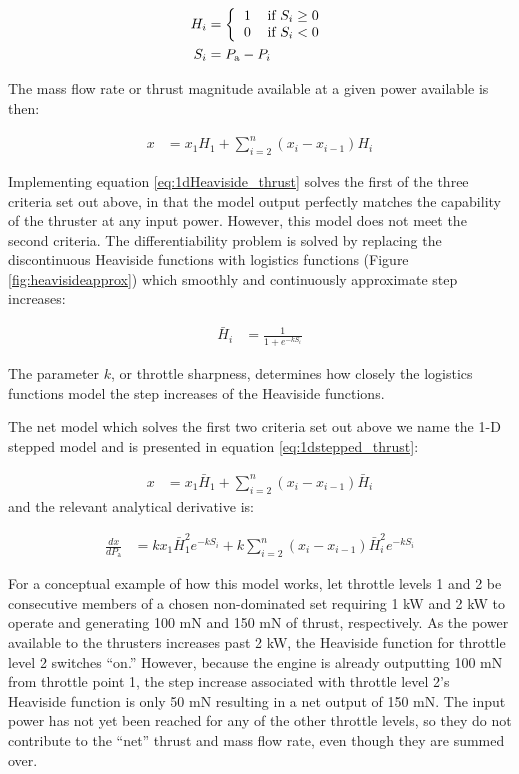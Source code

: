 \begin{align}
H_{i} &= \left \{
\begin{tabular}{cc}
1 & if $S_i \geq 0$\\
0 & if $S_i < 0$
\end{tabular}
\right.
\label{eq:Heaviside}\\
S_i &= P_\textrm{a} - P_i
\label{eq:Si}
\end{align}

The mass flow rate or thrust magnitude available at a given power available is then:

\begin{align}
x &= x_1H_1+\sum\limits_{i=2}^{n}(x_i-x_{i-1})H_{i}
\label{eq:1dHeaviside_thrust}
\end{align}

Implementing equation \ref{eq:1dHeaviside_thrust} solves the first of the three criteria set out above, in that the model output perfectly matches the capability of the thruster at any input power. However, this model does not meet the second criteria. The differentiability problem is solved by replacing the discontinuous Heaviside functions with logistics functions (Figure \ref{fig:heavisideapprox}) which smoothly and continuously approximate step increases:

\begin{align}
\bar{H}_{i} &= \frac{1}{1 + e^{-kS_i}}
\label{eq:logistic}
\end{align}

The parameter $k$, or throttle sharpness, determines how closely the logistics functions model the step increases of the Heaviside functions. 

The net model which solves the first two criteria set out above we name the 1-D stepped model and is presented in equation \ref{eq:1dstepped_thrust}:

\begin{align} 
x &= x_1\bar{H}_1+\sum\limits_{i=2}^{n}(x_i-x_{i-1})\bar{H}_i
\label{eq:1dstepped_thrust}
\end{align}
and the relevant analytical derivative is:

\begin{align}
\frac{dx}{dP_\textrm{a}} &= kx_1\bar{H}_1^2e^{-kS_i}+k\sum\limits_{i=2}^{n}(x_i-x_{i-1})\bar{H}_i^2e^{-kS_i}
\label{eq:1dstepped_thrust_dp}
\end{align}

For a conceptual example of how this model works, let throttle levels 1 and 2 be consecutive members of a chosen non-dominated set requiring 1 kW and 2 kW to operate and generating 100 mN and 150 mN of thrust, respectively. As the power available to the thrusters increases past 2 kW, the Heaviside function for throttle level 2 switches ``on.'' However, because the engine is already outputting 100 mN from throttle point 1, the step increase associated with throttle level 2's Heaviside function is only 50 mN resulting in a net output of 150 mN. The input power has not yet been reached for any of the other throttle levels, so they do not contribute to the ``net'' thrust and mass flow rate, even though they are summed over. 

